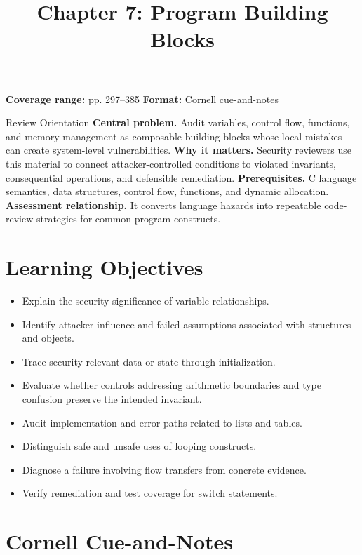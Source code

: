 \documentclass[11pt,letterpaper]{article}
\title{Chapter 7: Program Building Blocks}
\author{}
\date{}
\begin{document}
\maketitle

\begin{center}
\small\color{Meta}\textbf{Coverage range:} pp. 297--385 \quad\textbullet\quad \textbf{Format:} Cornell cue-and-notes
\end{center}
\vspace{0.25em}
\begin{CornellOverviewBox}{Review Orientation}
\textbf{Central problem.} Audit variables, control flow, functions, and memory management as composable building blocks whose local mistakes can create system-level vulnerabilities.
\textbf{Why it matters.} Security reviewers use this material to connect attacker-controlled conditions to violated invariants, consequential operations, and defensible remediation.
\textbf{Prerequisites.} C language semantics, data structures, control flow, functions, and dynamic allocation.
\textbf{Assessment relationship.} It converts language hazards into repeatable code-review strategies for common program constructs.
\end{CornellOverviewBox}
\section{Learning Objectives}
\begin{itemize}
\item Explain the security significance of variable relationships.
\item Identify attacker influence and failed assumptions associated with structures and objects.
\item Trace security-relevant data or state through initialization.
\item Evaluate whether controls addressing arithmetic boundaries and type confusion preserve the intended invariant.
\item Audit implementation and error paths related to lists and tables.
\item Distinguish safe and unsafe uses of looping constructs.
\item Diagnose a failure involving flow transfers from concrete evidence.
\item Verify remediation and test coverage for switch statements.
\end{itemize}
\section{Cornell Cue-and-Notes}
\end{document}
